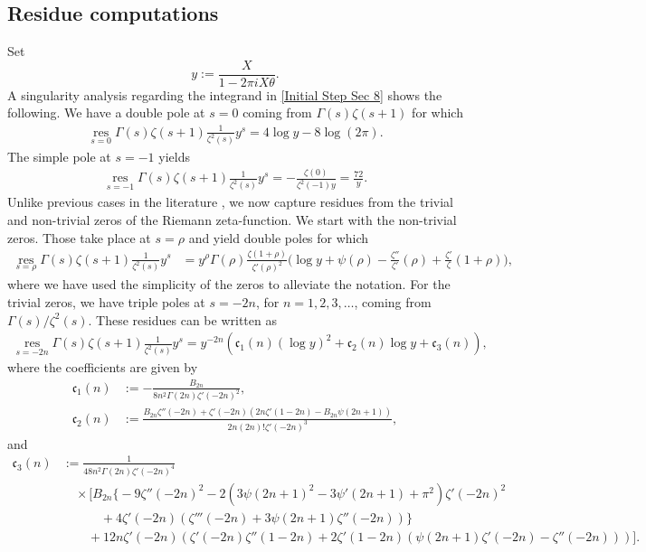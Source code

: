\documentclass[11pt]{amsart}
\numberwithin{equation}{section}
\numberwithin{figure}{section}
\theoremstyle{definition}
\begin{document}
\subsection*{Residue computations} Set 
\[y:=\frac{X}{1-2\pi i X\theta}.
\]
A singularity analysis regarding the integrand in \eqref{Initial Step Sec 8} shows the following. We have a double pole at $s=0$ coming from $\Gamma(s)\zeta(s+1)$ for which
\begin{align*}
\mathop{\operatorname{res}}\limits_{s=0} \Gamma(s) \zeta(s+1) \frac{1}{\zeta^2(s)} y^s = 4 \log y - 8 \log(2 \pi).
\end{align*}
The simple pole at $s=-1$ yields 
\begin{align*}
\mathop{\operatorname{res}}\limits_{s=-1} \Gamma(s) \zeta(s+1) \frac{1}{\zeta^2(s)} y^s = - \frac{\zeta(0)}{\zeta^2(-1)y} = \frac{72}{y}.
\end{align*}
Unlike previous cases in the literature \cite{bmz, brzz, drzz, dunnrobles, gafnipowers, gafniprimepowers}, we now capture residues from the trivial and non-trivial zeros of the Riemann zeta-function. We start with the non-trivial zeros. Those take place at $s = \rho$ and yield double poles for which
\begin{align*}
\mathop{\operatorname{res}}\limits_{s=\rho} \Gamma(s) \zeta(s+1) \frac{1}{\zeta^2(s)} y^s &= y^{\rho} \Gamma(\rho) \frac{\zeta(1+\rho)}{\zeta'(\rho)^2}\bigg(\log y + \psi(\rho) - \frac{\zeta''}{\zeta'}(\rho) + \frac{\zeta'}{\zeta}(1+\rho) \bigg),
\end{align*}
where we have used the simplicity of the zeros to alleviate the notation. For the trivial zeros, we have triple poles at $s=-2n$, for $n=1,2,3,\dots$, coming from $\Gamma(s)/\zeta^2(s)$. These residues can be written as
\begin{align*}
\mathop{\operatorname{res}}\limits_{s=-2n} \Gamma(s) \zeta(s+1) \frac{1}{\zeta^2(s)} y^s =  y^{-2 n}(\mathfrak{c}_1(n)(\log y)^2 + \mathfrak{c}_2(n)\log y + \mathfrak{c}_3(n)),
\end{align*}
where the coefficients are given by  
\begin{align}
\mathfrak{c}_1(n) &:= -\frac{B_{2 n}}{8 n^2 \Gamma (2 n) \zeta '(-2 n)^2}, \label{eq:defc1} \\
\mathfrak{c}_2(n) &:= \frac{B_{2 n} \zeta ''(-2 n)+\zeta '(-2 n) \left(2 n \zeta '(1-2 n)-B_{2 n} \psi (2n+1)\right)}{2 n (2 n)! \zeta '(-2 n)^3}, \label{eq:defc2} 
\end{align}
and
\begin{align} \label{eq:defc3}
    \mathfrak{c}_3(n) &:= \frac{1}{48 n^2 \Gamma (2 n) \zeta '(-2 n)^4} \nonumber \\
    &\quad \times \big[ B_{2 n} \big\{-9 \zeta ''(-2 n)^2-2 \left(3 \psi(2 n+1)^2-3 \psi'(2 n+1)+\pi
   ^2\right) \zeta '(-2 n)^2 \nonumber \\
   &\quad \quad \quad +4 \zeta '(-2 n) (\zeta '''(-2 n)+3 \psi(2 n+1)
   \zeta ''(-2 n))\big\} \nonumber \\
   &\quad \quad +12 n \zeta '(-2 n) \left(\zeta '(-2 n) \zeta ''(1-2 n)+2
   \zeta '(1-2 n) \left(\psi(2 n+1) \zeta '(-2 n)-\zeta ''(-2 n)\right)\right) \big].
\end{align}
\end{document}
